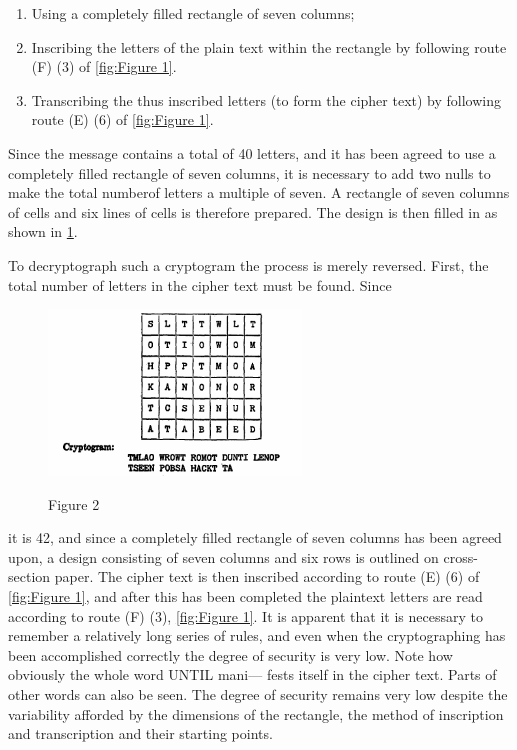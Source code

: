 \begin{enumerate}
\item Using a completely filled rectangle of seven columns;

\item Inscribing the letters of the plain text within the rectangle by
following route (F) (3) of \ref{fig:Figure 1}.

\item Transcribing the thus inscribed letters (to form the cipher text)
by following route (E) (6) of \ref{fig:Figure 1}.
\end{enumerate}

Since the message contains a total of 40 letters, and it has been
agreed to use a completely filled rectangle of seven columns, it is
necessary to add two nulls to make the total numberof letters a
multiple of seven. A rectangle of seven columns of cells and six
lines of cells is therefore prepared. The design is then filled in as
shown in \ref{fig:Figure 2}.

\mypara To decryptograph such a cryptogram the process is merely reversed.
First, the total number of letters in the cipher text must be found. Since

\begin{figure}[h]
  \centering
    \includegraphics[width=0.6\textwidth,natwidth=390,natheight=256]{Chapter2_Figure2.png}
    \label{fig:Figure 2}
    \caption{Figure 2}
\end{figure}

it is 42, and since a completely filled rectangle of seven columns has been
agreed upon, a design consisting of seven columns and six rows is outlined on cross-section paper. The cipher text is then inscribed according
to route (E) (6) of \ref{fig:Figure 1}, and after this has been completed the plaintext letters are read according to route (F) (3), \ref{fig:Figure 1}. It is apparent
that it is necessary to remember a relatively long series of rules, and even
when the cryptographing has been accomplished correctly the degree of
security is very low. Note how obviously the whole word UNTIL mani—
fests itself in the cipher text. Parts of other words can also be seen.
The degree of security remains very low despite the variability afforded
by the dimensions of the rectangle, the method of inscription and transcription and their starting points.

